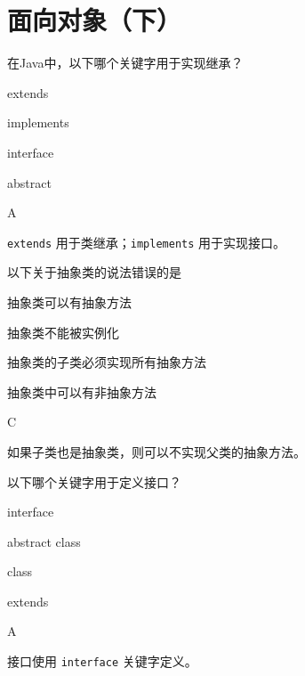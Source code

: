 \section{面向对象（下）}

\begin{question}
	在Java中，以下哪个关键字用于实现继承？
	\begin{options}
		\item extends
		\item implements
		\item interface
		\item abstract
	\end{options}
	\begin{answer}
		A
	\end{answer}
	\begin{explanation}
		\texttt{extends} 用于类继承；\texttt{implements} 用于实现接口。
	\end{explanation}
\end{question}

\begin{question}
	以下关于抽象类的说法错误的是
	\begin{options}
		\item 抽象类可以有抽象方法
		\item 抽象类不能被实例化
		\item 抽象类的子类必须实现所有抽象方法
		\item 抽象类中可以有非抽象方法
	\end{options}
	\begin{answer}
		C
	\end{answer}
	\begin{explanation}
		如果子类也是抽象类，则可以不实现父类的抽象方法。
	\end{explanation}
\end{question}

\begin{question}
	以下哪个关键字用于定义接口？
	\begin{options}
		\item interface
		\item abstract class
		\item class
		\item extends
	\end{options}
	\begin{answer}
		A
	\end{answer}
	\begin{explanation}
		接口使用 \texttt{interface} 关键字定义。
	\end{explanation}
\end{question}

